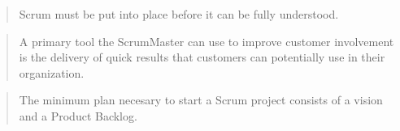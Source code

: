 \begin{quotation}
  Scrum must be put into place before it can be fully understood.
\end{quotation}


\begin{quotation}
  A primary tool the ScrumMaster can use to improve customer involvement is the delivery of quick results that customers can potentially use in their organization.
\end{quotation}



\begin{quotation}
  The minimum plan necesary to start a Scrum project consists of a vision and a Product Backlog.
\end{quotation}


\begin{quotation}
  
\end{quotation}


\begin{quotation}
  
\end{quotation}


\begin{quotation}
  
\end{quotation}


\begin{quotation}
  
\end{quotation}


\begin{quotation}
  
\end{quotation}


\begin{quotation}
  
\end{quotation}


\begin{quotation}
  
\end{quotation}


\begin{quotation}
  
\end{quotation}


\begin{quotation}
  
\end{quotation}



